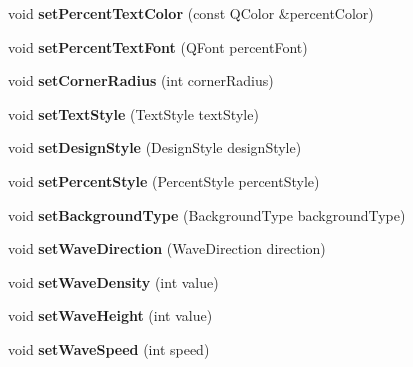 \begin{DoxyCompactItemize}
\item 
\mbox{\label{class_q_qt_custom_progress_bar_a8e0a64c33be433a96a67b3b8f5078743}} 
void {\bfseries set\+Percent\+Text\+Color} (const Q\+Color \&percent\+Color)
\item 
\mbox{\label{class_q_qt_custom_progress_bar_a869d1f670aa014e1ead795462fb35c40}} 
void {\bfseries set\+Percent\+Text\+Font} (Q\+Font percent\+Font)
\item 
\mbox{\label{class_q_qt_custom_progress_bar_a4817888296216e8570963b2bf595c61e}} 
void {\bfseries set\+Corner\+Radius} (int corner\+Radius)
\item 
\mbox{\label{class_q_qt_custom_progress_bar_a6b3d71234cd139b1d94d3b569d64069d}} 
void {\bfseries set\+Text\+Style} (Text\+Style text\+Style)
\item 
\mbox{\label{class_q_qt_custom_progress_bar_a7b9e9ac1da71da33b4dad814e8ae73c6}} 
void {\bfseries set\+Design\+Style} (Design\+Style design\+Style)
\item 
\mbox{\label{class_q_qt_custom_progress_bar_a57d4255d4317f2fa7c6a2a451c4ca8e9}} 
void {\bfseries set\+Percent\+Style} (Percent\+Style percent\+Style)
\item 
\mbox{\label{class_q_qt_custom_progress_bar_aea97cb1475aac16a799ca297f76de034}} 
void {\bfseries set\+Background\+Type} (Background\+Type background\+Type)
\item 
\mbox{\label{class_q_qt_custom_progress_bar_a7375994be25fd9cf96d1c539e6beac0b}} 
void {\bfseries set\+Wave\+Direction} (Wave\+Direction direction)
\item 
\mbox{\label{class_q_qt_custom_progress_bar_afad2ea415eb134b45456e201b46391cb}} 
void {\bfseries set\+Wave\+Density} (int value)
\item 
\mbox{\label{class_q_qt_custom_progress_bar_a3001a19f26ce55fcd89932add1347172}} 
void {\bfseries set\+Wave\+Height} (int value)
\item 
\mbox{\label{class_q_qt_custom_progress_bar_af88b0f0ee8eb22465c91077f0a7f5098}} 
void {\bfseries set\+Wave\+Speed} (int speed)
\end{DoxyCompactItemize}
